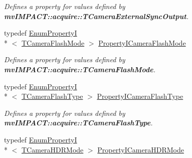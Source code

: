 \begin{DoxyCompactItemize}
\begin{DoxyCompactList}\small\item\em Defines a property for values defined by {\bfseries mv\+I\+M\+P\+A\+C\+T\+::acquire\+::\+T\+Camera\+External\+Sync\+Output}. \end{DoxyCompactList}\item 
\hypertarget{group___device_specific_interface_ga6a8c7e0a6ec0abe20119f36cdde81a1c}{typedef \hyperlink{classmv_i_m_p_a_c_t_1_1acquire_1_1_enum_property_i}{Enum\+Property\+I}\\*
$<$ \hyperlink{group___device_specific_interface_ga7013a9eafe8e5d0e6c9977dacf8871f7}{T\+Camera\+Flash\+Mode} $>$ \hyperlink{group___device_specific_interface_ga6a8c7e0a6ec0abe20119f36cdde81a1c}{Property\+I\+Camera\+Flash\+Mode}}\label{group___device_specific_interface_ga6a8c7e0a6ec0abe20119f36cdde81a1c}

\begin{DoxyCompactList}\small\item\em Defines a property for values defined by {\bfseries mv\+I\+M\+P\+A\+C\+T\+::acquire\+::\+T\+Camera\+Flash\+Mode}. \end{DoxyCompactList}\item 
\hypertarget{group___device_specific_interface_ga597262f972ec6a59487c7434c39ecfba}{typedef \hyperlink{classmv_i_m_p_a_c_t_1_1acquire_1_1_enum_property_i}{Enum\+Property\+I}\\*
$<$ \hyperlink{group___device_specific_interface_gafecb78a5d28cf072b169a8214d6b9a34}{T\+Camera\+Flash\+Type} $>$ \hyperlink{group___device_specific_interface_ga597262f972ec6a59487c7434c39ecfba}{Property\+I\+Camera\+Flash\+Type}}\label{group___device_specific_interface_ga597262f972ec6a59487c7434c39ecfba}

\begin{DoxyCompactList}\small\item\em Defines a property for values defined by {\bfseries mv\+I\+M\+P\+A\+C\+T\+::acquire\+::\+T\+Camera\+Flash\+Type}. \end{DoxyCompactList}\item 
\hypertarget{group___device_specific_interface_ga9fcfc71faac692386a041097fd751d24}{typedef \hyperlink{classmv_i_m_p_a_c_t_1_1acquire_1_1_enum_property_i}{Enum\+Property\+I}\\*
$<$ \hyperlink{group___device_specific_interface_ga4d3429fb463a4c07dc7a32d43c04f5d4}{T\+Camera\+H\+D\+R\+Mode} $>$ \hyperlink{group___device_specific_interface_ga9fcfc71faac692386a041097fd751d24}{Property\+I\+Camera\+H\+D\+R\+Mode}}\label{group___device_specific_interface_ga9fcfc71faac692386a041097fd751d24}


\end{DoxyCompactItemize}
